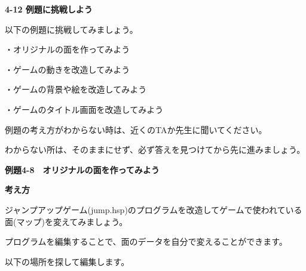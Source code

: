 \documentclass[a4paper,dvipdfmx]{jarticle}
\newcommand\textstyleqwerty[1]{#1}
\begin{document}
\bigskip


\bigskip


\bigskip


\bigskip


\bigskip


\bigskip

{\bfseries
4-12 例題に挑戦しよう}


\bigskip

以下の例題に挑戦してみましょう。


\bigskip

・オリジナルの面を作ってみよう

・ゲームの動きを改造してみよう

・ゲームの背景や絵を改造してみよう

・ゲームのタイトル画面を改造してみよう


\bigskip

例題の考え方がわからない時は、近くのTAか先生に聞いてください。

わからない所は、そのままにせず、必ず答えを見つけてから先に進みましょう。


\bigskip


\bigskip


\bigskip


\bigskip


\bigskip

\clearpage
\textstyleqwerty{\textbf{例題4-8　オリジナルの面を作ってみよう}}


\bigskip

{\bfseries
考え方}


\bigskip

ジャンプアップゲーム(jump.hsp)のプログラムを改造してゲームで使われている面(マップ)を変えてみましょう。

プログラムを編集することで、面のデータを自分で変えることができます。

以下の場所を探して編集します。
\end{document}
